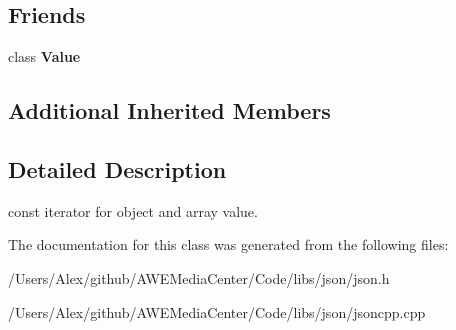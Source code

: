 \subsection*{Friends}
\begin{DoxyCompactItemize}
\item 
\hypertarget{class_json_1_1_value_const_iterator_aeceedf6e1a7d48a588516ce2b1983d6f}{class {\bfseries Value}}\label{class_json_1_1_value_const_iterator_aeceedf6e1a7d48a588516ce2b1983d6f}

\end{DoxyCompactItemize}
\subsection*{Additional Inherited Members}


\subsection{Detailed Description}
const iterator for object and array value. 



The documentation for this class was generated from the following files\-:\begin{DoxyCompactItemize}
\item 
/\-Users/\-Alex/github/\-A\-W\-E\-Media\-Center/\-Code/libs/json/json.\-h\item 
/\-Users/\-Alex/github/\-A\-W\-E\-Media\-Center/\-Code/libs/json/jsoncpp.\-cpp\end{DoxyCompactItemize}
